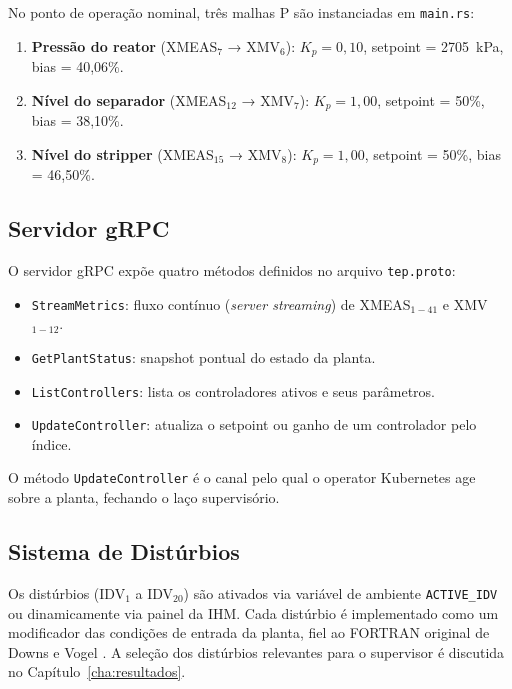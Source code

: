 No ponto de operação nominal, três malhas P são instanciadas em \texttt{main.rs}:

\begin{enumerate}
  \item \textbf{Pressão do reator} (XMEAS$_7$ → XMV$_6$): $K_p = 0{,}10$, setpoint = 2705~kPa, bias = 40,06\%.
  \item \textbf{Nível do separador} (XMEAS$_{12}$ → XMV$_7$): $K_p = 1{,}00$, setpoint = 50\%, bias = 38,10\%.
  \item \textbf{Nível do stripper} (XMEAS$_{15}$ → XMV$_8$): $K_p = 1{,}00$, setpoint = 50\%, bias = 46,50\%.
\end{enumerate}

\subsection{Servidor gRPC}

O servidor gRPC expõe quatro métodos definidos no arquivo \texttt{tep.proto}:

\begin{itemize}
  \item \texttt{StreamMetrics}: fluxo contínuo (\textit{server streaming}) de XMEAS$_{1-41}$ e XMV$_{1-12}$.
  \item \texttt{GetPlantStatus}: snapshot pontual do estado da planta.
  \item \texttt{ListControllers}: lista os controladores ativos e seus parâmetros.
  \item \texttt{UpdateController}: atualiza o setpoint ou ganho de um controlador pelo índice.
\end{itemize}

O método \texttt{UpdateController} é o canal pelo qual o operator Kubernetes age sobre a planta, fechando o laço supervisório.

\subsection{Sistema de Distúrbios}

Os distúrbios (IDV$_1$ a IDV$_{20}$) são ativados via variável de ambiente \texttt{ACTIVE\_IDV} ou dinamicamente via painel da IHM. Cada distúrbio é implementado como um modificador das condições de entrada da planta, fiel ao FORTRAN original de Downs e Vogel \cite{DOWNS1993}. A seleção dos distúrbios relevantes para o supervisor é discutida no Capítulo~\ref{cha:resultados}.

